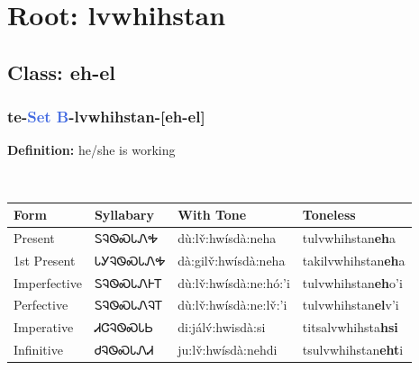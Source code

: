 \needspace{4in}
\section*{Root: lvwhihstan}
\nopagebreak
{}
\needspace{3in}
\subsection*{Class: eh-el}
\nopagebreak
\needspace{2in}
\subsubsection*{te{-}\textcolor{RoyalBlue}{Set B}{-}\textbf{lvwhihstan}{-}[eh-el]}
\nopagebreak
\textbf{Definition: } he/she is working
\\[0.5em]
\begin{tabularx}{\textwidth}{l X X X}%
\toprule%
\textbf{Form}&\textbf{Syllabary}&\textbf{With Tone}&\textbf{Toneless}\\%
\midrule%
Present&ᏚᎸᏫᏍᏓᏁᎭ&dù:lv̌:hwísdà:neha&tulvwhihstan\textbf{eh}a\\%
1st Present&ᏓᎩᎸᏫᏍᏓᏁᎭ&dà:gilv̌:hwísdà:neha&takilvwhihstan\textbf{eh}a\\%
Imperfective&ᏚᎸᏫᏍᏓᏁᎰᎢ&dù:lv̌:hwísdà:ne:hó:’i&tulvwhihstan\textbf{eh}o'i\\%
Perfective&ᏚᎸᏫᏍᏓᏁᎸᎢ&dù:lv̌:hwísdà:ne:lv̌:’i&tulvwhihstan\textbf{el}v'i\\%
Imperative&ᏗᏣᎸᏫᏍᏓᏏ&di:jálv́:hwisdà:si&titsalvwhihsta\textbf{hsi}\\%
Infinitive&ᏧᎸᏫᏍᏓᏁᏗ&ju:lv̌:hwísdà:nehdi&tsulvwhihstan\textbf{eht}i\\%
\bottomrule%
\end{tabularx}
\\[1em]